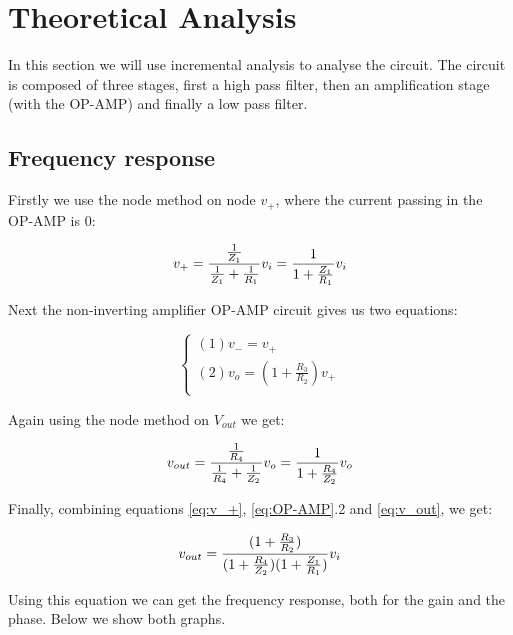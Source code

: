 \section{Theoretical Analysis}
\label{sec:analysis}
In this section we will use incremental analysis to analyse the circuit. The circuit is composed of three stages, first a high pass filter, then an amplification stage (with the OP-AMP) and finally a low pass filter.
\par

\subsection{Frequency response}
Firstly we use the node method on node $v_+$, where the current passing in the OP-AMP is 0:

\begin{equation}\label{eq:v_+}
v_+=\frac{\frac{1}{Z_1}}{\frac{1}{Z_1}+\frac{1}{R_1}} v_i = \frac{1}{1+\frac{Z_1}{R_1}} v_i\\
\end{equation}

Next the non-inverting amplifier OP-AMP circuit gives us two equations:

\begin{equation}\label{eq:OP-AMP}
\begin{cases}
(1)  v_-=v_+\\
(2)  v_o=(1+\frac{R_3}{R_2})v_+\\
\end{cases}
\end{equation}

Again using the node method on $V_{out}$ we get:

\begin{equation}\label{eq:v_out}
v_{out}=\frac{\frac{1}{R_4}}{\frac{1}{R_4}+\frac{1}{Z_2}} v_o = \frac{1}{1+\frac{R_4}{Z_2}} v_o\\
\end{equation}

Finally, combining equations \ref{eq:v_+}, \ref{eq:OP-AMP}.2 and \ref{eq:v_out}, we get:

\begin{equation}\label{eq:v_final}
v_{out}=\frac{(1+\frac{R_3}{R_2})}{(1+\frac{R_4}{Z_2})(1+\frac{Z_1}{R_1})} v_i\\
\end{equation}

Using this equation we can get the frequency response, both for the gain and the phase. Below we show both graphs.
\par

